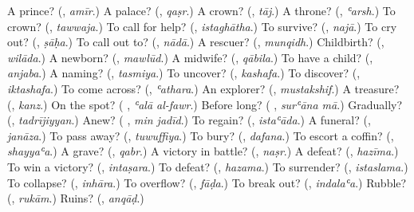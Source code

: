 \begin{tcolorbox}[breakable,colback=teal!4,colframe=teal!35!black,title={Before you move on}]
A prince? (\textbf{}, \emph{amīr}.) A palace? (\textbf{}, \emph{qaṣr}.) A crown? (\textbf{}, \emph{tāj}.) A throne? (\textbf{}, \emph{ʿarsh}.) To crown? (\textbf{}, \emph{tawwaja}.) To call for help? (\textbf{}, \emph{istaghātha}.) To survive? (\textbf{}, \emph{najā}.) To cry out? (\textbf{}, \emph{ṣāḥa}.) To call out to? (\textbf{}, \emph{nādā}.) A rescuer? (\textbf{}, \emph{munqidh}.) Childbirth? (\textbf{}, \emph{wilāda}.) A newborn? (\textbf{}, \emph{mawlūd}.) A midwife? (\textbf{}, \emph{qābila}.) To have a child? (\textbf{}, \emph{anjaba}.) A naming? (\textbf{}, \emph{tasmiya}.) To uncover? (\textbf{}, \emph{kashafa}.) To discover? (\textbf{}, \emph{iktashafa}.) To come across? (\textbf{}, \emph{ʿathara}.) An explorer? (\textbf{}, \emph{mustakshif}.) A treasure? (\textbf{}, \emph{kanz}.) On the spot? (\textbf{ }, \emph{ʿalā al-fawr}.) Before long? (\textbf{ }, \emph{surʿāna mā}.) Gradually? (\textbf{}, \emph{tadrījiyyan}.) Anew? (\textbf{ }, \emph{min jadīd}.) To regain? (\textbf{}, \emph{istaʿāda}.) A funeral? (\textbf{}, \emph{janāza}.) To pass away? (\textbf{}, \emph{tuwuffiya}.) To bury? (\textbf{}, \emph{dafana}.) To escort a coffin? (\textbf{}, \emph{shayyaʿa}.) A grave? (\textbf{}, \emph{qabr}.) A victory in battle? (\textbf{}, \emph{naṣr}.) A defeat? (\textbf{}, \emph{hazīma}.) To win a victory? (\textbf{}, \emph{intaṣara}.) To defeat? (\textbf{}, \emph{hazama}.) To surrender? (\textbf{}, \emph{istaslama}.) To collapse? (\textbf{}, \emph{inhāra}.) To overflow? (\textbf{}, \emph{fāḍa}.) To break out? (\textbf{}, \emph{indalaʿa}.) Rubble? (\textbf{}, \emph{rukām}.) Ruins? (\textbf{}, \emph{anqāḍ}.)
\end{tcolorbox}
